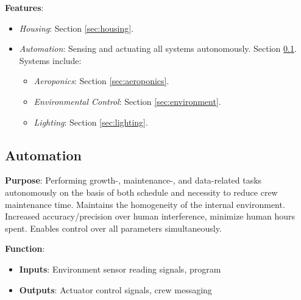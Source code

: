 \documentclass{report}
\begin{document}
\textbf{Features}:
\begin{itemize}
    \item \textit{Housing}: Section \ref{sec:housing}.
    \item \textit{Automation}: Sensing and actuating all systems autonomously. Section \ref{sec:automation}. Systems include:
    \begin{itemize}
        \item \textit{Aeroponics}: Section \ref{sec:aeroponics}.
        \item \textit{Environmental Control}: Section \ref{sec:environment}.
        \item \textit{Lighting}: Section \ref{sec:lighting}.
    \end{itemize}
\end{itemize}

\newpage

\subsection{Automation}
\label{sec:automation}

\textbf{Purpose}: Performing growth-, maintenance-, and data-related tasks autonomously on the basis of both schedule and necessity to reduce crew maintenance time. Maintains the homogeneity of the internal environment. Increased accuracy/precision over human interference, minimize human hours spent. Enables control over all parameters simultaneously.

\textbf{Function}:
\begin{itemize}
    \item \textbf{Inputs}: Environment sensor reading signals, program
    \item \textbf{Outputs}: Actuator control signals, crew messaging
\end{itemize}
\end{document}

